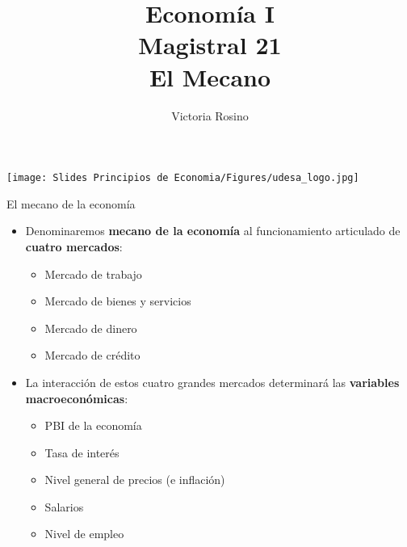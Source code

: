 \documentclass{beamer}
\title[Economía I]{Economía I \vspace{3mm}
\\ Magistral 21 \vspace{3mm} \\ El Mecano}
\date{}
\author[Victoria Rosino]{Victoria Rosino}
\institute[]{Universidad de San Andrés}
\begin{document}
\begin{frame}
\vspace{0.3cm}
\titlepage
\centering
\vspace{-0.9cm}
\texttt{[image: Slides Principios de Economia/Figures/udesa\_logo.jpg]} 
\end{frame}

\begin{frame}{El mecano de la economía}
\begin{itemize}
    \item Denominaremos \textbf{mecano de la economía} al funcionamiento articulado de \textbf{cuatro mercados}:
    \begin{itemize}
    \item Mercado de trabajo
    \item Mercado de bienes y servicios
    \item Mercado de dinero 
    \item Mercado de crédito    
    \end{itemize}
    \vspace{2mm}
 \item La interacción de estos cuatro grandes mercados determinará las \textbf{variables macroeconómicas}:
    \begin{itemize}
    \item PBI de la economía
    \item Tasa de interés
    \item Nivel general de precios (e inflación)
    \item Salarios  
    \item Nivel de empleo
    \end{itemize}
 \end{itemize}
\end{frame}
\end{document}
